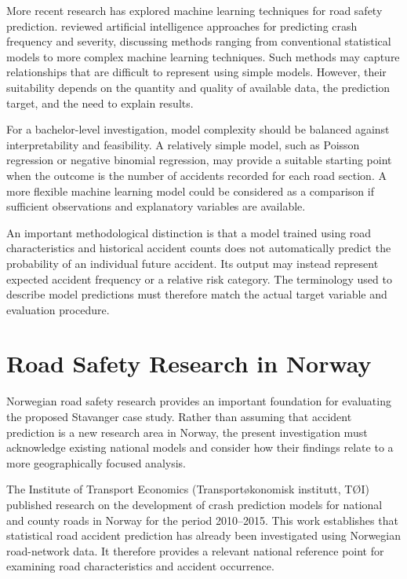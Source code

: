 More recent research has explored machine learning techniques for road safety prediction. \textcite{Butt2025} reviewed artificial intelligence approaches for predicting crash frequency and severity, discussing methods ranging from conventional statistical models to more complex machine learning techniques. Such methods may capture relationships that are difficult to represent using simple models. However, their suitability depends on the quantity and quality of available data, the prediction target, and the need to explain results.

For a bachelor-level investigation, model complexity should be balanced against interpretability and feasibility. A relatively simple model, such as Poisson regression or negative binomial regression, may provide a suitable starting point when the outcome is the number of accidents recorded for each road section. A more flexible machine learning model could be considered as a comparison if sufficient observations and explanatory variables are available.

An important methodological distinction is that a model trained using road characteristics and historical accident counts does not automatically predict the probability of an individual future accident. Its output may instead represent expected accident frequency or a relative risk category. The terminology used to describe model predictions must therefore match the actual target variable and evaluation procedure.

\section{Road Safety Research in Norway}
\label{sec:lit-topic-4}
Norwegian road safety research provides an important foundation for evaluating the proposed Stavanger case study. Rather than assuming that accident prediction is a new research area in Norway, the present investigation must acknowledge existing national models and consider how their findings relate to a more geographically focused analysis.

The Institute of Transport Economics (Transport{\o}konomisk institutt, T{\O}I) published research on the development of crash prediction models for national and county roads in Norway for the period 2010–2015. This work establishes that statistical road accident prediction has already been investigated using Norwegian road-network data. It therefore provides a relevant national reference point for examining road characteristics and accident occurrence.

